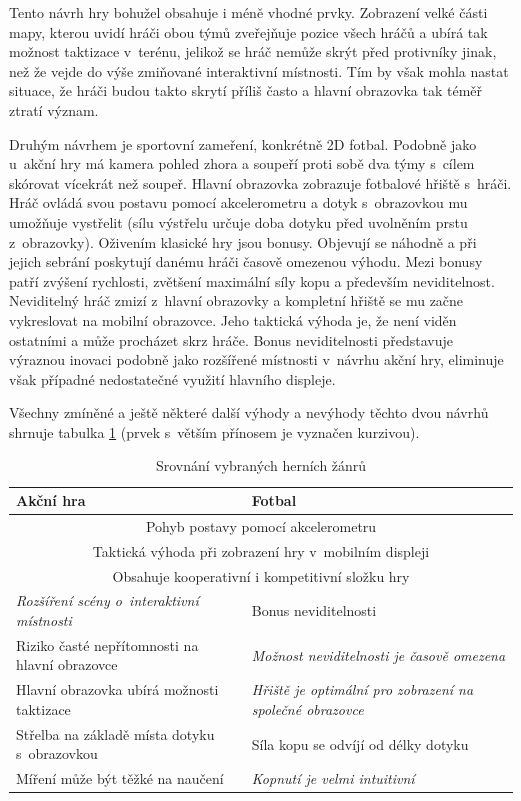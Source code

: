 \documentclass[thesis=B,czech,hidelinks]{FITthesis}[2012/06/26] %
\begin{document}
Tento návrh hry bohužel obsahuje i méně vhodné prvky. Zobrazení velké části mapy, kterou uvidí hráči obou týmů zveřejňuje pozice všech hráčů a ubírá tak možnost taktizace v~terénu, jelikož se hráč nemůže skrýt před protivníky jinak, než že vejde do výše zmiňované interaktivní místnosti. Tím by však mohla nastat situace, že hráči budou takto skrytí příliš často a hlavní obrazovka tak téměř ztratí význam.

Druhým návrhem je sportovní zameření, konkrétně 2D fotbal. Podobně jako u~akční hry má kamera pohled zhora a soupeří proti sobě dva týmy s~cílem skórovat vícekrát než soupeř. Hlavní obrazovka zobrazuje fotbalové hřiště s~hráči. Hráč ovládá svou postavu pomocí akcelerometru a dotyk s~obrazovkou mu umožňuje vystřelit (sílu výstřelu určuje doba dotyku před uvolněním prstu z~obrazovky). Oživením klasické hry jsou bonusy. Objevují se náhodně a při jejich sebrání poskytují danému hráči časově omezenou výhodu. Mezi bonusy patří zvýšení rychlosti, zvětšení maximální síly kopu a především neviditelnost. Neviditelný hráč zmizí z~hlavní obrazovky a kompletní hřiště se mu začne vykreslovat na mobilní obrazovce. Jeho taktická výhoda je, že není viděn ostatními a může procházet skrz hráče. Bonus neviditelnosti představuje výraznou inovaci podobně jako rozšířené místnosti v~návrhu akční hry, eliminuje však případné nedostatečné využití hlavního displeje.

Všechny zmíněné a ještě některé další výhody a nevýhody těchto dvou návrhů shrnuje tabulka \ref{table:game_comparison} (prvek s~větším přínosem je vyznačen kurzivou).

\begin{table}[h]
\caption{Srovnání vybraných herních žánrů}
\label{table:game_comparison}
\begin{tabularx}{\textwidth}{|X|X|}
\hline
\textbf{Akční hra} & \textbf{Fotbal} \\ \hline
\multicolumn{2}{|c|}{Pohyb postavy pomocí akcelerometru}\\ \hline
\multicolumn{2}{|c|}{Taktická výhoda při zobrazení hry v~mobilním displeji}\\ \hline
\multicolumn{2}{|c|}{Obsahuje kooperativní i kompetitivní složku hry}\\ \hline
\emph{Rozšíření scény o~interaktivní místnosti} & Bonus neviditelnosti \\ \hline
Riziko časté nepřítomnosti na hlavní obrazovce & \emph{Možnost neviditelnosti je časově omezena} \\ \hline
Hlavní obrazovka ubírá možnosti taktizace & \emph{Hřiště je optimální pro zobrazení na společné obrazovce} \\ \hline

Střelba na základě místa dotyku s~obrazovkou & Síla kopu se odvíjí od délky dotyku \\ \hline
Míření může být těžké na naučení & \emph{Kopnutí je velmi intuitivní} \\ \hline
\end{tabularx}
\end{table}
\end{document}
